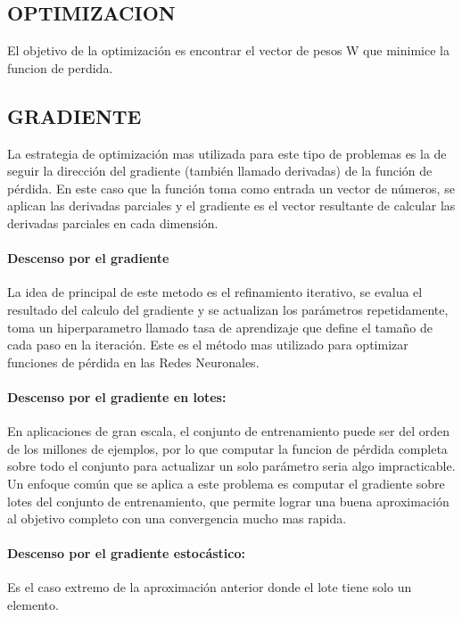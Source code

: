 \documentclass[a4paper,12pt,spanish]{book}
\begin{document}
    \subsection{OPTIMIZACION}
      El objetivo de la optimización es encontrar el vector de pesos W que minimice la funcion de perdida.

    \subsection{GRADIENTE} 
      La estrategia de optimización mas utilizada para este tipo de problemas es la de seguir la dirección del gradiente (también llamado derivadas) de la función de pérdida.
      En este caso que la función toma como entrada un vector de números, se aplican las derivadas parciales y el gradiente es el vector resultante de calcular las derivadas parciales
      en cada dimensión.

      \paragraph{Descenso por el gradiente}
	La idea de principal de este metodo es el refinamiento iterativo, se evalua el resultado del calculo del gradiente y se actualizan los parámetros repetidamente, 
	toma un hiperparametro llamado tasa de aprendizaje que define el tamaño de cada paso en la iteración.
	Este es el método mas utilizado para optimizar funciones de pérdida en las Redes Neuronales. 

      \paragraph{Descenso por el gradiente en lotes:} 
	En aplicaciones de gran escala, el conjunto de entrenamiento puede ser del orden de los millones de ejemplos, por lo que computar la funcion de 
	pérdida completa sobre todo el conjunto para actualizar un solo parámetro seria algo impracticable.
	Un enfoque común que se aplica a este problema es computar el gradiente sobre lotes del conjunto de entrenamiento, que permite lograr una buena aproximación al objetivo completo con
	una convergencia mucho mas rapida.

      \paragraph{Descenso por el gradiente estocástico:} 
	Es el caso extremo de la aproximación anterior donde el lote tiene solo un elemento.
\end{document}
